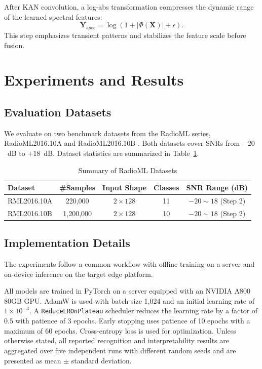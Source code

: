 \documentclass{article}
\begin{document}
	After KAN convolution, a log-abs transformation compresses the dynamic range of the learned spectral features:
	\begin{equation}
		\mathbf{Y}_{spec} = \log(1 + |\Phi(\mathbf{X})| + \epsilon).
	\end{equation}
	This step emphasizes transient patterns and stabilizes the feature scale before fusion.
	
	\section{Experiments and Results}
	\label{sec:ExpRes}
	
	\subsection{Evaluation Datasets}
	We evaluate on two benchmark datasets from the RadioML series, RadioML2016.10A and RadioML2016.10B \cite{oshea2016Convolutionalradiob}.
	Both datasets cover SNRs from $-20$~dB to $+18$~dB.
	Dataset statistics are summarized in Table~\ref{tab:datasets}.
	
	\begin{table}[htbp]
		\centering
		\caption{Summary of RadioML Datasets}
		\label{tab:datasets}
		\renewcommand{\arraystretch}{1.2}
		\begin{tabular}{lcccc}
			\toprule[1.5pt]
			\textbf{Dataset} & \textbf{\#Samples} & \textbf{Input Shape} & \textbf{Classes} & \textbf{SNR Range (dB)} \\
			\midrule
			RML2016.10A & 220,000   & $2 \times 128$ & 11 & $-20 \sim 18$ (Step 2) \\
			RML2016.10B & 1,200,000 & $2 \times 128$ & 10 & $-20 \sim 18$ (Step 2) \\
			\bottomrule[1.5pt]
		\end{tabular}
	\end{table}
	
	\subsection{Implementation Details}
	The experiments follow a common workflow with offline training on a server and on-device inference on the target edge platform.
	
	All models are trained in PyTorch on a server equipped with an NVIDIA A800 80GB GPU.
	AdamW is used with batch size 1{,}024 and an initial learning rate of $1 \times 10^{-3}$.
	A \texttt{ReduceLROnPlateau} scheduler reduces the learning rate by a factor of 0.5 with patience of 3 epochs.
	Early stopping uses patience of 10 epochs with a maximum of 60 epochs.
	Cross-entropy loss is used for optimization.
	Unless otherwise stated, all reported recognition and interpretability results are aggregated over five independent runs with different random seeds and are presented as mean $\pm$ standard deviation.
	
\end{document}
